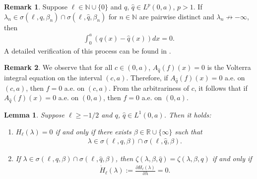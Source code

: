 \documentclass[reqno,12pt,centertags]{amsart}
\numberwithin{equation}{section}
\newtheorem{lemma}[theorem]{Lemma}
\theoremstyle{definition}
\newtheorem{remark}{Remark}[section]
\begin{document}
\begin{remark}\label{r3.2}
Suppose $\ell\in \mathbb{N}\cup\{0\}$ and $q$, $\hat{q}\in L^{p}(0, a)$, $p>1$.
If $\lambda_n \in \sigma(\ell, q, \beta_{n}) \cap \sigma(\ell, \hat{q}, \beta_{n})$ for $n \in\mathbb{N}$ are pairwise distinct and $\lambda_n \nrightarrow-\infty$, then
\begin{align}\label{e3.2}
\int_{0}^{a}(q(x)-\hat{q}(x))dx=0.
\end{align}
A detailed verification of this process can be found in \cite[proof of Theorem 1.2]{XYB2023}.
\end{remark}

\begin{remark}\label{r3.3}
We observe that for all $c\in(0,a)$,
$A_{\hat{q}}(f)(x)= 0$
is the Volterra integral equation on the interval $(c,a)$. Therefore, if $A_{\hat{q}}(f)(x)= 0$ a.e. on $(c,a)$, then $f=0$ a.e. on $(c,a)$. From the arbitrariness of $c$, it follows that if $A_{\hat{q}}(f)(x)= 0$ a.e. on $(0,a)$, then $f=0$ a.e. on $(0,a)$.  
\end{remark}

\begin{lemma}\label{l3.4}
Suppose $\ell\geq-1/2$ and $q$, $\hat{q}\in L^{1}(0, a)$. Then it holds:  
\begin{enumerate}[label=\textnormal{(\arabic*).}]
\item $H_{\ell}(\lambda)=0$ if and only if there exists $\beta \in \mathbb{R} \cup\{\infty\}$ such that
\begin{align*}
\lambda\in\sigma(\ell,q,\beta)\cap\sigma(\ell,\hat{q},\beta).
\end{align*}
\item If $\lambda \in \sigma(\ell, q, \beta) \cap \sigma(\ell, \hat{q}, \beta)$, then  $\zeta(\lambda,\beta, \hat{q})=\zeta(\lambda,\beta, q)$ if and only if 
\begin{align*}
\dot{H}_{\ell}(\lambda):=\frac{\partial H_{\ell}(\lambda)}{\partial \lambda}=0.
\end{align*}
\end{enumerate}
\end{lemma}
\end{document}
